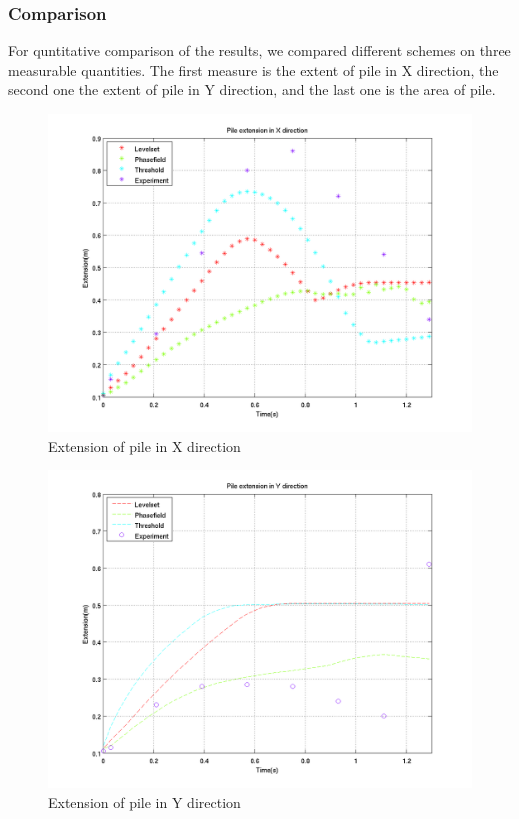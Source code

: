\documentclass[letterpaper,10pt]{article}
\begin{document}
\subsubsection{Comparison}

For quntitative comparison of the results, we compared different schemes on three measurable quantities. 
The first measure is the extent of pile in X direction, the second one the extent of pile in Y direction, and 
the last one is the area of pile.


\begin{figure}[H]
\centerline{\includegraphics[scale=0.5]{IMAGES/xextend.png}}
\caption{Extension of pile in X direction}
\label{xextent}
\end{figure}


\begin{figure}[H]
\centerline{\includegraphics[scale=0.5]{IMAGES/yextend.png}}
\caption{Extension of pile in Y direction}
\label{yextent}
\end{figure}
\end{document}
